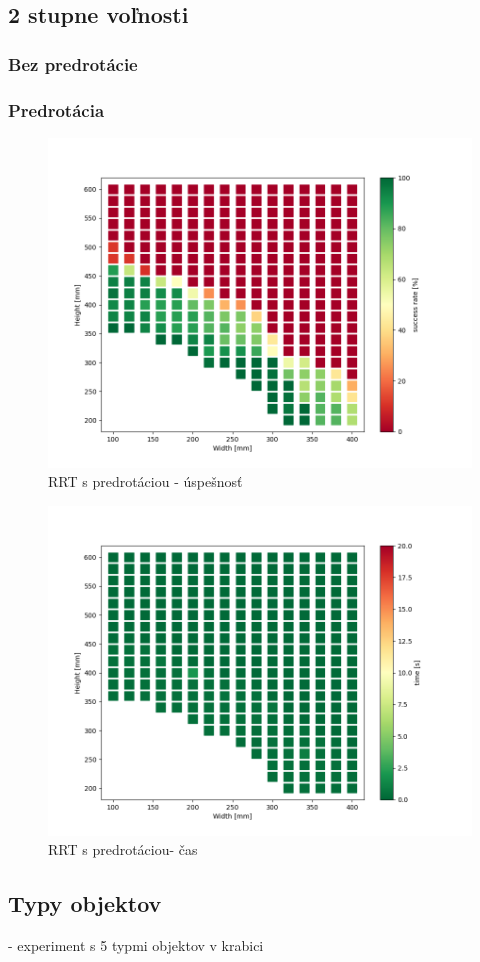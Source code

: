 \subsection{2 stupne voľnosti}
\label{kap:5.2}

\subsubsection{Bez predrotácie}


\subsubsection{Predrotácia}
\begin{figure}[h]
	\centering
	\includegraphics[width=140mm]{img/2Q-size.png}
	\caption{RRT s predrotáciou - úspešnosť} \label{OBRAZOK 5.2.1} 
\end{figure} 

\begin{figure}[h]
	\centering
	\includegraphics[width=140mm]{img/2Q-time.png}
	\caption{RRT s predrotáciou- čas} \label{OBRAZOK 5.2.2} 
\end{figure} 

\subsection{Typy objektov}
\label{kap:5.3}
- experiment s 5 typmi objektov v krabici

